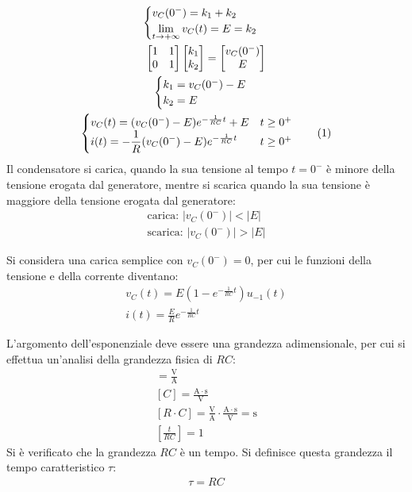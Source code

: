 \documentclass{article}
\newcommand{\tageq}{\tag{\stepcounter{equation}\theequation}}
\newcommand{\SI}[1]{\mathrm{#1}}
\numberwithin{equation}{subsection}
\begin{document}
\begin{gather*}
    \begin{cases}
        v_C(0^-)=k_1+k_2\\
        \displaystyle\lim_{t\to+\infty}v_C(t)=E=k_2
    \end{cases}\\
    \begin{bmatrix}
        1&1\\0&1
    \end{bmatrix}\begin{bmatrix}
        k_1\\k_2
    \end{bmatrix}=\begin{bmatrix}
        v_C(0^-)\\E
    \end{bmatrix}\\
    \begin{cases}
        k_1=v_C(0^-)-E\\
        k_2=E
    \end{cases}\\
    \begin{cases}
        v_C(t)=(v_C(0^-)-E)e^{-\frac{1}{RC}t}+E&t\geq0^+\\
        i(t)=-\displaystyle\frac{1}{R}(v_C(0^-)-E)e^{-\frac{1}{RC}t} &t\geq0^+
    \end{cases}\tageq
\end{gather*}
Il condensatore si carica, quando la sua tensione al tempo $t=0^-$ è minore della tensione erogata dal generatore, mentre si scarica quando la sua tensione è maggiore della 
tensione erogata dal generatore:
\begin{gather*}
    \mbox{carica: }|v_C(0^-)|<|E|\\
    \mbox{scarica: }|v_C(0^-)|>|E|
\end{gather*}

Si considera una carica semplice con $v_C(0^-)=0$, per cui le funzioni della tensione e della corrente diventano:
\begin{gather*}
    v_C(t)=E\left(1-e^{-\frac{1}{RC}t}\right)u_{-1}(t)\\
    i(t)=\displaystyle\frac{E}{R}e^{-\frac{1}{RC}t}
\end{gather*}

L'argomento dell'esponenziale deve essere una grandezza adimensionale, per cui si effettua un'analisi della grandezza fisica di $RC$:
\begin{gather*}
    [R]=\displaystyle\frac{\SI{V}}{\SI{A}}\\
    [C]=\displaystyle\frac{\SI{A}\cdot \SI{s}}{\SI{V}}\\
    [R\cdot C]=\displaystyle\frac{\SI{V}}{\SI{A}}\cdot\frac{\SI{A}\cdot \SI{s}}{\SI{V}}=\SI{s}\\
    \left[\displaystyle\frac{t}{RC}\right]=1  
\end{gather*}
Si è verificato che la grandezza $RC$ è un tempo. Si definisce questa grandezza il tempo caratteristico $\tau$:
\begin{gather}
    \tau=RC
\end{gather}
\end{document}
